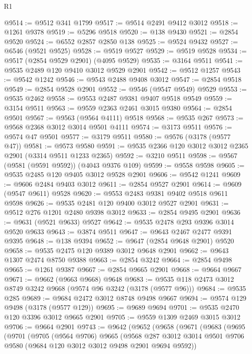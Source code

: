 \begin{lexlean}{R1}
\begin{coremodule}
@9514 := @9512 @341 @1799
@9517 := @9514 @2491 @9412 @3012
@9518 := @1261 @9378
@9519 := @5296 @9518
@9520 := @138 @9430
@9521 := @2854 @9520
@9524 := @6552 @2857 @2850 @138
@9525 := @9524 @9432
@9527 := @6546 (@9521 @9525)
@9528 := @9519 @9527
@9529 := @9519 @9528
@9534 := @9517 (@2854 @9529 @2901) (@4095 @9529)
@9535 := @3164 @9511
@9541 := @9535 @2489 @120 @9410 @3012 @9529 @2901
@9542 := @9512 @1257
@9543 := @9542 @1242
@9546 := @9543 @2488 @9408 @3012
@9547 := @2854 @9518
@9549 := @2854 @9528 @2901
@9552 := @9546 (@9547 @9549) @9529
@9553 := @9535 @2462
@9558 := @9553 @2487 @9381 @9407 @9518 @9549
@9559 := @3154 @9511
@9563 := @9559 @2363 @2461 @3015 @9380
@9564 := @2854 @9501
@9567 := @9563 (@9564 @4111) @9518
@9568 := @9535 @267
@9573 := @9568 @2368 @3012 @3014 @9501 @4111
@9574 := @3173 @9511
@9576 := @9574 @47 @9501
@9577 := @3179 @9511
@9580 := @9576 (@3178 (@9577 @47))
@9581 := @9573 @9580
@9591 := @9535 @2366 @120 @3012 @3012 @2365 @2901 (@3314 @9511 @1233 @2365)
@9592 := @3210 @9511
@9598 := @9567 (@9581 (@9591 @9592)) (@4043 @9376 @109)
@9599 := @9558 @9598
@9605 := @9535 @2485 @120 @9405 @3012 @9528 @2901
@9606 := @9542 @1241
@9609 := @9606 @2484 @9403 @3012
@9611 := @2854 @9527 @2901
@9614 := @9609 (@9547 @9611) @9528
@9620 := @9553 @2483 @9381 @9402 @9518 @9611 @9598
@9626 := @9535 @2481 @120 @9400 @3012 @9527 @2901
@9631 := @9512 @276 @1201 @2480 @9398 @3012
@9633 := @2854 @9495 @2901
@9636 := @9631 (@9521 @9633) @9527
@9642 := @9535 @2478 @293 @9396 @3014 @9520 @9633
@9643 := @3874 @9511
@9647 := @9643 @2467 @2477 @9391 @9395
@9648 := @138 @9394
@9652 := @9647 (@2854 @9648 @2901) @9520
@9658 := @9535 @2475 @120 @9389 @3012 @9648 @2901
@9662 := @9643 @1307 @2474 @8750 @9388
@9663 := @2854 @3242
@9664 := @2854 @9498
@9665 := @1261 @9387
@9667 := @2854 @9665 @2901
@9668 := @9664 @9667
@9671 := @9662 (@9663 @9668) @9648
@9683 := @9535 @118 @2473 @3012 @8749 @3242 @9668 (@9574 @96 @3242 (@3178 (@9577 @96)))
@9684 := @9535 @285
@9689 := @9684 @2472 @3012 @8748 @9498 @9667
@9694 := @9574 @129 @9498 (@3178 (@9577 @129))
@9695 := @9689 @9694
@9701 := @9535 @2470 @120 @3396 @3012 @9665 @2901
@9705 := @9559 @1309 @2469 @3015 @3012
@9706 := @9664 @2901
@9743 := @9642
    (@9652
      (@9658
        (@9671
          (@9683
            (@9695
              (@9701
                (@9705
                  (@9564 @9706)
                  @9665
                  (@9568
                    @287
                    @3012
                    @3014
                    @9501
                    @9706
                    @9580
                    (@9684 @120 @3012 @3012 @9498 @2901 @9694 @9592))

\end{coremodule}
\end{lexlean}
